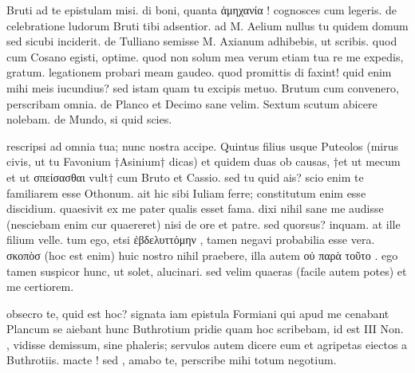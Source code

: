 


 Bruti ad te epistulam misi. di boni, quanta ἀμηχανία ! cognosces cum legeris. de celebratione ludorum Bruti tibi adsentior. ad M. Aelium nullus tu quidem domum sed sicubi inciderit. de Tulliano semisse M. Axianum adhibebis, ut scribis. quod cum Cosano egisti, optime. quod non solum mea verum etiam tua re me expedis, gratum. legationem probari meam gaudeo. quod promittis di faxint! quid enim mihi meis iucundius? sed istam quam tu excipis metuo. Brutum cum convenero, perscribam omnia. de Planco et Decimo sane velim. Sextum scutum abicere nolebam. de Mundo, si quid scies.

 rescripsi ad omnia tua; nunc nostra accipe. Quintus filius usque Puteolos (mirus civis, ut tu Favonium †Asinium† dicas) et quidem duas ob causas, †et ut mecum et ut σπείσασθαι vult† cum Bruto et Cassio. sed tu quid ais? scio enim te familiarem esse Othonum. ait hic sibi Iuliam ferre; constitutum enim esse discidium. quaesivit ex me pater qualis esset fama. dixi nihil sane me audisse (nesciebam enim cur quaereret) nisi de ore et patre. sed quorsus? inquam. at ille filium velle. tum ego, etsi ἐβδελυττόμην , tamen negavi probabilia esse vera. σκοπὸσ (hoc est enim) huic nostro nihil praebere, illa autem οὐ παρὰ τοῦτο . ego tamen suspicor hunc, ut solet, alucinari. sed velim quaeras (facile autem potes) et me certiorem.

 obsecro te, quid est hoc? signata iam epistula Formiani qui apud me cenabant Plancum se aiebant hunc Buthrotium pridie quam hoc scribebam, id est III Non. , vidisse demissum, sine phaleris; servulos autem dicere eum et agripetas eiectos a Buthrotiis. macte ! sed , amabo te, perscribe mihi totum negotium.

